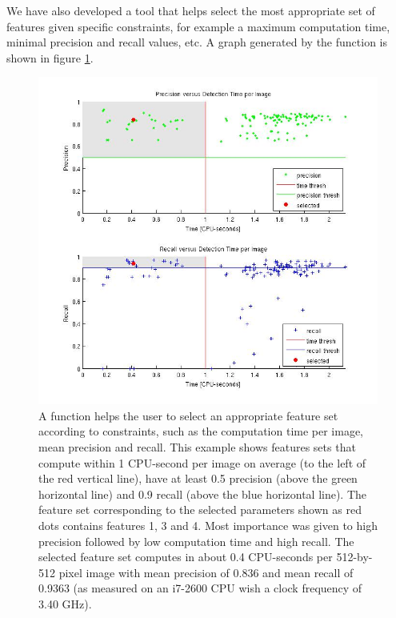 	We have also developed a tool that helps select the most appropriate set of features given specific constraints, for example a maximum computation time, minimal precision and recall values, etc. A graph generated by the function is shown in figure \ref{fig:bestFeatureSelector}.
	
	\begin{figure}[h]
		\includegraphics[width=\textwidth]{images/best_features}
		\caption{A function helps the user to select an appropriate feature set according to constraints, such as the computation time per image, mean precision and recall. This example shows features sets that compute within 1 CPU-second per image on average (to the left of the red vertical line), have at least 0.5 precision (above the green horizontal line) and 0.9 recall (above the blue horizontal line). The feature set corresponding to the selected parameters shown as red dots contains features 1, 3 and 4. Most importance was given to high precision followed by low computation time and high recall. The selected feature set computes in about 0.4 CPU-seconds per 512-by-512 pixel image with mean precision of 0.836 and mean recall of 0.9363 (as measured on an i7-2600 CPU wish a clock frequency of 3.40 GHz).}
	    \label{fig:bestFeatureSelector}
	\end{figure}
	
